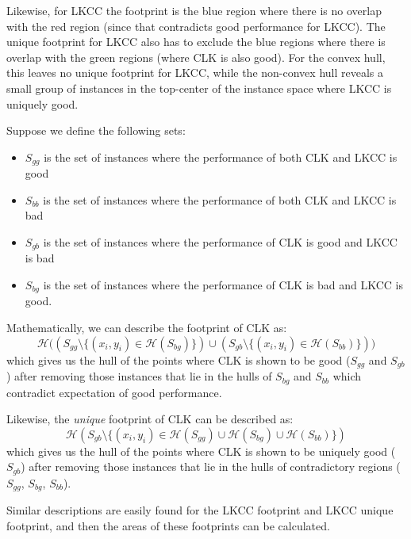 \documentclass[conference]{IEEEtran}
\begin{document}
Likewise, for LKCC the footprint is the blue region where there is no overlap with the red region (since that contradicts good performance for LKCC). The unique footprint for LKCC also has to exclude the blue regions where there is overlap with the green regions (where CLK is also good). For the convex hull, this leaves no unique footprint for LKCC, while the non-convex hull reveals a small group of instances in the top-center of the instance space where LKCC is uniquely good.

Suppose we define the following sets:
\begin{itemize}[leftmargin=3]
\item $S_{gg}$ is the set of instances where the performance of both CLK and LKCC is good
\item $S_{bb}$ is the set of instances where the performance of both CLK and LKCC is bad
\item $S_{gb}$ is the set of instances where the performance of CLK is good and LKCC is bad
\item $S_{bg}$ is the set of instances where the performance of CLK is bad and LKCC is good.
\end{itemize}
Mathematically, we can describe the footprint of CLK as:
\begin{displaymath}
\mathcal{H}\big((S_{gg} \setminus \{(x_i, y_i) \in \mathcal{H}(S_{bg})\}) \cup (S_{gb} \setminus \{(x_i, y_i) \in \mathcal{H}(S_{bb})\})\big)
\end{displaymath}
which gives us the hull of the points where CLK is shown to be good ($S_{gg}$ and $S_{gb}$) after removing those instances that lie in the hulls of $S_{bg}$ and $S_{bb}$ which contradict expectation of good performance.

\suppressfloats %

Likewise, the \emph{unique} footprint of CLK can be described as:
\begin{displaymath}
\mathcal{H}(S_{gb} \setminus \{(x_i, y_i) \in \mathcal{H}(S_{gg}) \cup \mathcal{H}(S_{bg}) \cup \mathcal{H}(S_{bb})\})
\end{displaymath}
which gives us the hull of the points where CLK is shown to be uniquely good ($S_{gb}$) after removing those instances that lie in the hulls of contradictory regions ($S_{gg}$, $S_{bg}$, $S_{bb}$).

Similar descriptions are easily found for the LKCC footprint and LKCC unique footprint, and then the areas of these footprints can be calculated.
\end{document}
